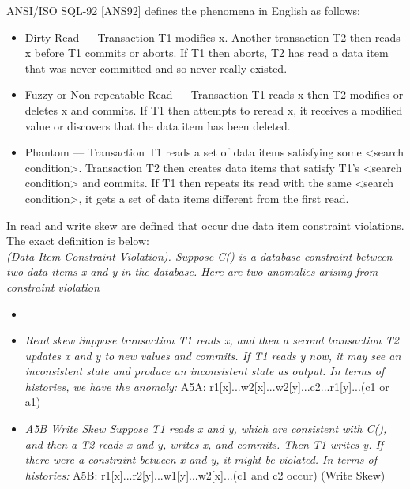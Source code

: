\documentclass[a4paper,10pt,titlepage]{report}
\begin{document}
    ANSI/ISO SQL-92 [ANS92] defines the phenomena in English as follows:
    \begin{itemize}
        \item Dirty Read — Transaction T1 modifies x. Another transaction T2 then reads x before T1 commits or aborts. If T1 then aborts, T2 has read a data item that was never committed and so never really existed.
        \item Fuzzy or Non-repeatable Read — Transaction T1 reads x  then T2 modifies or deletes x and commits. If T1 then attempts to reread x, it receives a modified value or discovers that the data item has been deleted.
    \item Phantom — Transaction T1 reads a set of data items satisfying some <search condition>. Transaction T2 then creates data items that satisfy T1's <search condition> and commits. If T1 then repeats its read with the same <search condition>, it gets a set of data items different from the first read.
\end{itemize}



    In \cite{Berensonetal} read and write skew are defined that occur due data item constraint violations. The exact definition is below: \\

    \textit{(Data Item Constraint Violation). Suppose C() is a database constraint between two data items x and y in the database. Here are two anomalies arising from constraint violation}

\begin{itemize}
\item 
\item \textit{Read skew Suppose transaction T1 reads x, and then a second transaction T2 updates x and y to new values and commits. If T1 reads y now, it may see an inconsistent state and produce an inconsistent state as output.
In terms of histories, we have the anomaly:  }
A5A: r1[x]...w2[x]...w2[y]...c2...r1[y]...(c1 or a1)
\item \textit{A5B Write Skew Suppose T1 reads x and y, which are
consistent with C(), and then a T2 reads x and y, writes x,
and commits. Then T1 writes y. If there were a constraint
between x and y, it might be violated. In terms of histories:}
A5B: r1[x]...r2[y]...w1[y]...w2[x]...(c1 and c2 occur)
(Write Skew)
\end{itemize}
\end{document}
